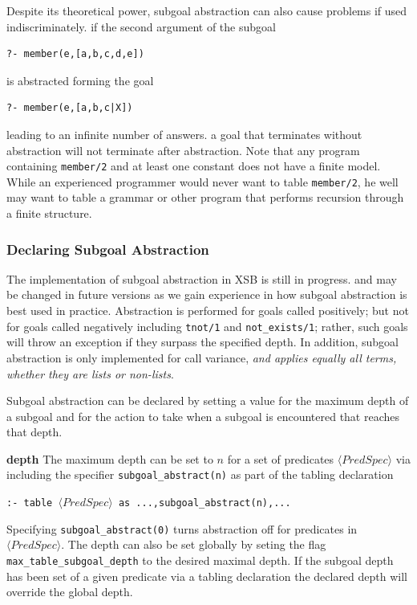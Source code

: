 Despite its theoretical power, subgoal abstraction can also cause
problems if used indiscriminately.  if the second argument of the
subgoal
%
\begin{verbatim}
?- member(e,[a,b,c,d,e])
\end{verbatim}
%
is abstracted forming the goal
%
\begin{verbatim}
?- member(e,[a,b,c|X])
\end{verbatim}
%
leading to an infinite number of answers.  a goal that terminates
without abstraction will not terminate after abstraction.  Note that
any program containing {\tt member/2} and at least one constant does
not have a finite model.  While an experienced programmer would never
want to table {\tt member/2}, he well may want to table a grammar or
other program that performs recursion through a finite structure.

\subsubsection{Declaring Subgoal Abstraction}
%
The implementation of subgoal abstraction in XSB is still in progress.
and may be changed in future versions as we gain experience in how
subgoal abstraction is best used in practice.  Abstraction is
performed for goals called positively; but not for goals called
negatively including {\tt tnot/1} and {\tt not\_exists/1}; rather, such
goals will throw an exception if they surpass the specified depth.  In
addition, subgoal abstraction is only implemented for call variance,
{\em and applies equally all terms, whether they are lists or
  non-lists}.


Subgoal abstraction can be declared by setting a value for the maximum
depth of a subgoal and for the action to take when a subgoal is
encountered that reaches that depth.
%
\bi
\item {\bf depth} The maximum depth can be set to $n$ for a set of
  predicates $\langle PredSpec \rangle$ via including the specifier
  {\tt subgoal\_abstract(n)} as part of the tabling declaration

{\tt :- table $\langle PredSpec\rangle$  as ...,subgoal\_abstract(n),...}

  Specifying {\tt subgoal\_abstract(0)} turns abstraction off for
  predicates in $\langle PredSpec \rangle$.  The depth can also be set
  globally by seting the flag {\tt max\_table\_subgoal\_depth} to the
  desired maximal depth.  If the subgoal depth has been set of a given
  predicate via a tabling declaration the declared depth will override
  the global depth.

